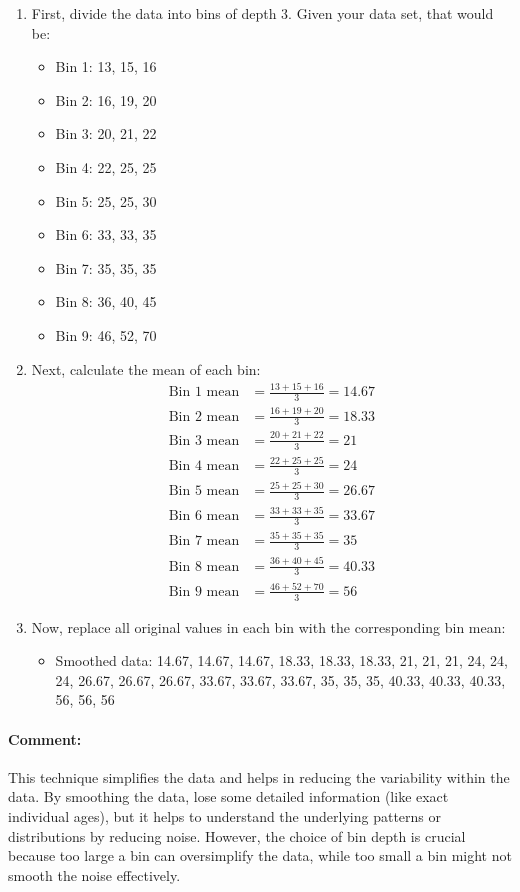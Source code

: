 \documentclass{article}
\begin{document}
\begin{enumerate}
  \item First, divide the data into bins of depth 3. Given your data set, that would be:
  \begin{itemize}
    \item Bin 1: 13, 15, 16
    \item Bin 2: 16, 19, 20
    \item Bin 3: 20, 21, 22
    \item Bin 4: 22, 25, 25
    \item Bin 5: 25, 25, 30
    \item Bin 6: 33, 33, 35
    \item Bin 7: 35, 35, 35
    \item Bin 8: 36, 40, 45
    \item Bin 9: 46, 52, 70
  \end{itemize}
  \item Next, calculate the mean of each bin:
  \begin{align*}
    \text{Bin 1 mean} &= \frac{13 + 15 + 16}{3} = 14.67 \\
    \text{Bin 2 mean} &= \frac{16 + 19 + 20}{3} = 18.33 \\
    \text{Bin 3 mean} &= \frac{20 + 21 + 22}{3} = 21 \\
    \text{Bin 4 mean} &= \frac{22 + 25 + 25}{3} = 24 \\
    \text{Bin 5 mean} &= \frac{25 + 25 + 30}{3} = 26.67 \\
    \text{Bin 6 mean} &= \frac{33 + 33 + 35}{3} = 33.67 \\
    \text{Bin 7 mean} &= \frac{35 + 35 + 35}{3} = 35 \\
    \text{Bin 8 mean} &= \frac{36 + 40 + 45}{3} = 40.33 \\
    \text{Bin 9 mean} &= \frac{46 + 52 + 70}{3} = 56
  \end{align*}
  \item Now, replace all original values in each bin with the corresponding bin mean:
  \begin{itemize}
    \item Smoothed data: 14.67, 14.67, 14.67, 18.33, 18.33, 18.33, 21, 21, 21, 24, 24, 24, 26.67, 26.67, 26.67, 33.67, 33.67, 33.67, 35, 35, 35, 40.33, 40.33, 40.33, 56, 56, 56
  \end{itemize}
\end{enumerate}

\paragraph{Comment:} This technique simplifies the data and helps in reducing the variability within the data. By smoothing the data, lose some detailed information (like exact individual ages), but it helps to understand the underlying patterns or distributions by reducing noise. However, the choice of bin depth is crucial because too large a bin can oversimplify the data, while too small a bin might not smooth the noise effectively.
\end{document}
